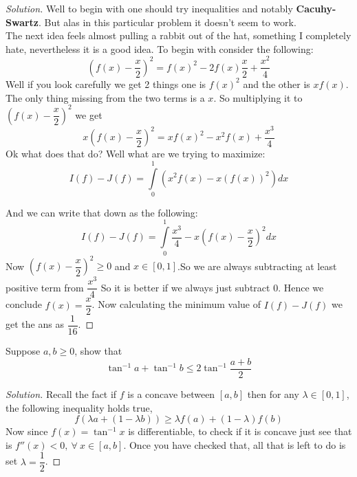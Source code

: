 \documentclass{scrartcl} %
\begin{document}
\begin{proof}[Solution]
	Well to begin with one should try inequalities and notably \textbf{Cacuhy-Swartz}. But alas in this particular problem it doesn't seem to work.\\
	The next idea feels almost pulling a rabbit out of the hat, something  I completely hate, nevertheless it is a good idea. To begin with consider the following:
	\[
		\left(f(x) - \dfrac{x}{2}\right)^2 = f(x)^2 - 2f(x)\dfrac{x}{2} + \dfrac{x^2}{4}
	\]
	Well if you look carefully we get 2 things one is $f(x)^2$ and the other is $xf(x)$. The only thing missing from the two terms is a $x$. So multiplying it to $\left(f(x) - \dfrac{x}{2}\right)^2$ we get 
	\[
		x\left(f(x) - \dfrac{x}{2}\right)^2 = xf(x)^2 - x^2f(x) + \dfrac{x^3}{4}
	\]
	Ok what does that do? Well what are we trying to maximize:
	\[
		I(f) - J(f) = \int\limits_0^1
		\left(x^2f(x) - x(f(x))^2\right) dx
		\]

And we can write that down as the following:
\[
	I(f) - J(f) = \int\limits_0^1 \dfrac{x^
	3}{4} - x\left(f(x) - \dfrac{x}{2}\right)^2 dx
\]
Now $\left(f(x) - \dfrac{x}{2}\right)^2 \geq 0$
and $x \in [0,1]$.So we are always subtracting
at least positive term from $\dfrac{x^3}{4}$
So it is better if we always just subtract $0$.
Hence we conclude $\boxed{f(x) = \dfrac{x}{2}}$.
Now calculating the minimum value of $I(f) - J(f)$ we get the ans as $\boxed{\dfrac{1}{16}}$.
\end{proof}

\newpage
\begin{example}[CMI A6, 2020]
	Suppose $a, b \geq 0 $, show that 
	\[
		\tan^{-1} a + \tan^{-1} b \leq 2\tan^{-1}\dfrac{a+b}{2}
	\]
\end{example}
\begin{proof}[Solution]
	Recall the fact if $f$ is a concave between $[a,b]$ then for any $\lambda \in
	[0,1]$, the following inequality holds true,
	\[
		f\left(\lambda a + \left(1 - \lambda b\right)\right) \geq \lambda f(a)
		+ (1-\lambda)f(b)
	\]
	Now since $f(x) = \tan^{-1} x$ is differentiable, to check if it is concave 
	just see that is $f''(x) < 0, \ \forall\ x \in [a,b]$. Once you have checked that, 
	all that is left to do is set $\lambda  = \dfrac{1}{2}$.
\end{proof}
\end{document}
